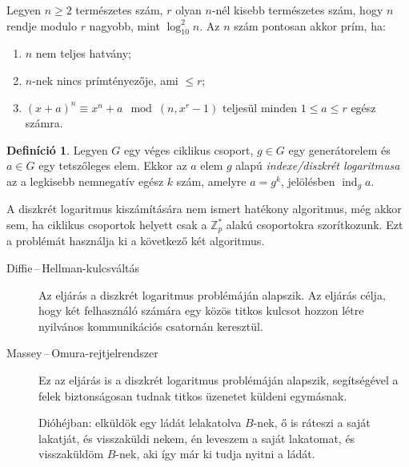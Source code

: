 \documentclass[%
	DIV=15,appendixprefix]{scrreprt}
\theoremstyle{definition}
\newtheorem*{defin}{Definíció}
\theoremstyle{remark}
\DeclareMathOperator{\ind}{ind}
\begin{document}
\begin{description}
		Legyen $ n \ge 2 $ természetes szám, $ r $ olyan $ n $-nél kisebb természetes szám, hogy
		$ n $ rendje modulo $ r $ nagyobb, mint $ \log_{ 10 }^{ 2 } n $. Az $ n $ szám pontosan
		akkor prím, ha:
		\begin{enumerate}
		\item $ n $ nem teljes hatvány;
		\item $ n $-nek nincs prímtényezője, ami $ \le r $;
		\item $ \left( x + a \right)^{ n } \equiv x^{ n } + a \mod{ \left( n, x^{ r } - 1
			\right) } $ teljesül minden $ 1 \le a \le r $ egész számra.
		\end{enumerate}
\end{description}
%
\begin{defin}
	Legyen $G$ egy véges ciklikus csoport, $ g \in G $ egy generátorelem és $ a \in G $ egy
	tetszőleges elem. Ekkor az $ a $ elem $ g $ alapú \emph{indexe/diszkrét logaritmusa} az a
	legkisebb nemnegatív egész $ k $ szám, amelyre $ a = g^{ k }$, jelölésben $ \ind_{ g } a $.
\end{defin}
A diszkrét logaritmus kiszámítására nem ismert hatékony algoritmus, még akkor sem, ha ciklikus
csoportok helyett csak a $ \mathbb{ Z }_{ p }^{ * } $ alakú csoportokra szorítkozunk. Ezt a
problémát használja ki a következő két algoritmus.
\begin{description}
	\item[Diffie\,--\,Hellman-kulcsváltás] Az eljárás a diszkrét logaritmus problémáján alapszik. Az
		eljárás célja, hogy két felhasználó számára egy közös titkos kulcsot hozzon létre nyilvános
		kommunikációs csatornán keresztül.

	\item[Massey\,--\,Omura-rejtjelrendszer] Ez az eljárás is a diszkrét logaritmus problémáján
		alapszik, segítségével a felek biztonságosan tudnak titkos üzenetet küldeni egymásnak.

		Dióhéjban: elküldök egy ládát lelakatolva $ B $-nek, ő is ráteszi a saját lakatját,
		és visszaküldi nekem, én leveszem a saját lakatomat, és visszaküldöm $ B $-nek, aki így
		már ki tudja nyitni a ládát.
\end{description}
%
\end{document}
